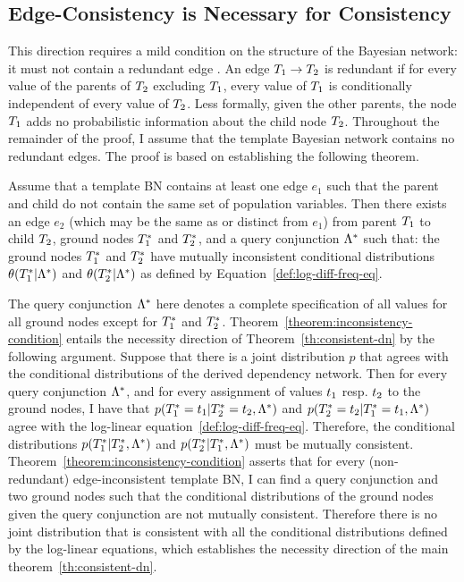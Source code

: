 \documentclass{sfuthesis}
\begin{document}
\begin{appendices}
\section{Edge-Consistency is Necessary for Consistency} 
This direction requires a mild condition on the structure of the Bayesian network: it must not contain a redundant edge \cite{Pearl1988}. An edge $T_{1}\rightarrow T_{2}$ is redundant if for every value of the parents of $T_{2}$ excluding $T_{1}$, every value of $T_{1}$ is conditionally independent of every value of $T_{2}$. Less formally, given the other parents, the node $T_{1}$ adds no probabilistic information about the child node $T_{2}$. Throughout the remainder of the proof, I  assume that the template Bayesian network contains no redundant edges.
The proof is based on establishing the following theorem. 

\begin{theorem}\label{theorem:inconsistency-condition}
Assume that a template BN contains at least one edge $e_1$ such that the parent and child do not contain the same set of population variables. Then there exists an edge $e_2$ (which may be the same as or distinct from $e_1$) from parent $T_{1}$ to child $T_{2}$, ground nodes $T_{1}^{*}\hspace{0.0ex}$ and $T_{2}^{*}\hspace{0.0ex}$,  and a query conjunction $\Lambda^{*}\hspace{0.0ex}$ such that: the ground nodes $T_{1}^{*}\hspace{0.0ex}$ and $T_{2}^{*}\hspace{0.0ex}$ have mutually inconsistent conditional distributions $\theta(T_{1}^{*}\hspace{0.0ex}|\Lambda^{*}\hspace{0.0ex})$ and $\theta(T_{2}^{*}\hspace{0.0ex}|\Lambda^{*}\hspace{0.0ex})$ as defined by Equation~\ref{def:log-diff-freq-eq}.
\end{theorem}

The query conjunction $\Lambda^{*}\hspace{0.0ex}$ here denotes a complete specification of all values for all ground nodes except for $T_{1}^{*}\hspace{0.0ex}$ and $T_{2}^{*}\hspace{0.0ex}$. Theorem~\ref{theorem:inconsistency-condition} entails the necessity direction of Theorem~\ref{th:consistent-dn} by the following argument. Suppose that there is a joint distribution $p$ that agrees with the conditional distributions of the derived dependency network. Then for every query conjunction $\Lambda^{*}\hspace{0.0ex}$, and for every assignment of values $t_{1}$ resp. $t_{2}$ to the ground nodes, I   have that $p(T_{1}^{*}\hspace{0.0ex}=t_{1}|T_{2}^{*}\hspace{0.0ex}=t_{2},\Lambda^{*}\hspace{0.0ex})$ and $p(T_{2}^{*}\hspace{0.0ex}=t_{2}|T_{1}^{*}\hspace{0.0ex}=t_{1},\Lambda^{*}\hspace{0.0ex})$ agree with the log-linear equation~\ref{def:log-diff-freq-eq}. Therefore, the conditional distributions $p(T_{1}^{*}\hspace{0.0ex}|T_{2}^{*}\hspace{0.0ex},\Lambda^{*}\hspace{0.0ex})$ and $p(T_{2}^{*}\hspace{0.0ex}|T_{1}^{*}\hspace{0.0ex},\Lambda^{*}\hspace{0.0ex})$ must be mutually consistent. 
Theorem~\ref{theorem:inconsistency-condition} asserts that for every (non-redundant) edge-inconsistent template BN, I  can find a query conjunction and two ground nodes such that the conditional distributions of the ground nodes given the query conjunction are not mutually consistent. Therefore there is no joint distribution that is consistent with all the conditional distributions defined by the log-linear equations, which establishes the necessity direction of the main theorem~\ref{th:consistent-dn}. 


\end{appendices}
\end{document}
